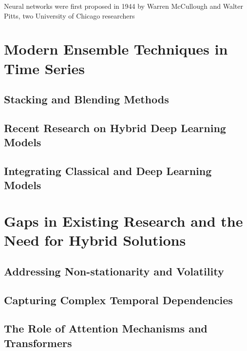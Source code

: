 \begin{enumerate}
\end{enumerate}



Neural networks were first proposed in 1944 by Warren McCullough and Walter Pitts, two University of Chicago researchers 

\section{Modern Ensemble Techniques in Time Series} %
\label{Sec: ensemble learning}

\subsection{Stacking and Blending Methods} %

\subsection{Recent Research on Hybrid Deep Learning Models} %

\subsection{Integrating Classical and Deep Learning Models} %

\section{Gaps in Existing Research and the Need for Hybrid Solutions} %
\subsection{Addressing Non-stationarity and Volatility} %

\subsection{Capturing Complex Temporal Dependencies} %

\subsection{The Role of Attention Mechanisms and Transformers} %

